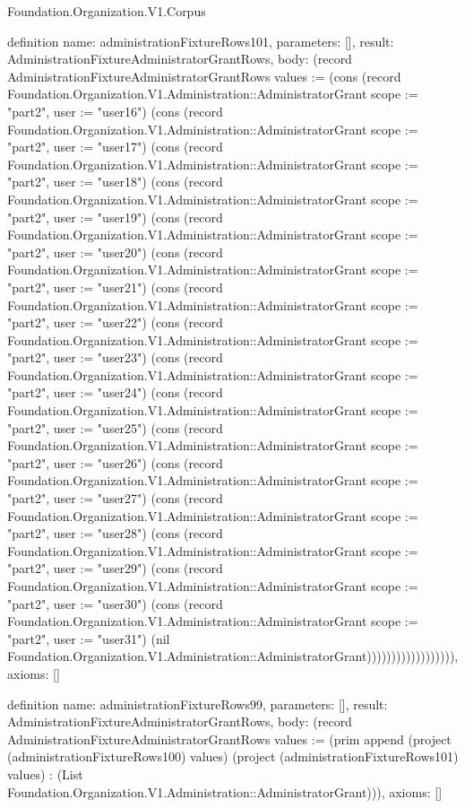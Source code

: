 \begin{lexlean}{Foundation.Organization.V1.Corpus}
\begin{semanticmodule}
definition{
  name: administrationFixtureRows101,
  parameters: [],
  result: AdministrationFixtureAdministratorGrantRows,
  body: (record AdministrationFixtureAdministratorGrantRows {values := (cons (record Foundation.Organization.V1.Administration::AdministratorGrant {scope := "part2", user := "user16"}) (cons (record Foundation.Organization.V1.Administration::AdministratorGrant {scope := "part2", user := "user17"}) (cons (record Foundation.Organization.V1.Administration::AdministratorGrant {scope := "part2", user := "user18"}) (cons (record Foundation.Organization.V1.Administration::AdministratorGrant {scope := "part2", user := "user19"}) (cons (record Foundation.Organization.V1.Administration::AdministratorGrant {scope := "part2", user := "user20"}) (cons (record Foundation.Organization.V1.Administration::AdministratorGrant {scope := "part2", user := "user21"}) (cons (record Foundation.Organization.V1.Administration::AdministratorGrant {scope := "part2", user := "user22"}) (cons (record Foundation.Organization.V1.Administration::AdministratorGrant {scope := "part2", user := "user23"}) (cons (record Foundation.Organization.V1.Administration::AdministratorGrant {scope := "part2", user := "user24"}) (cons (record Foundation.Organization.V1.Administration::AdministratorGrant {scope := "part2", user := "user25"}) (cons (record Foundation.Organization.V1.Administration::AdministratorGrant {scope := "part2", user := "user26"}) (cons (record Foundation.Organization.V1.Administration::AdministratorGrant {scope := "part2", user := "user27"}) (cons (record Foundation.Organization.V1.Administration::AdministratorGrant {scope := "part2", user := "user28"}) (cons (record Foundation.Organization.V1.Administration::AdministratorGrant {scope := "part2", user := "user29"}) (cons (record Foundation.Organization.V1.Administration::AdministratorGrant {scope := "part2", user := "user30"}) (cons (record Foundation.Organization.V1.Administration::AdministratorGrant {scope := "part2", user := "user31"}) (nil Foundation.Organization.V1.Administration::AdministratorGrant)))))))))))))))))}),
  axioms: []
}

definition{
  name: administrationFixtureRows99,
  parameters: [],
  result: AdministrationFixtureAdministratorGrantRows,
  body: (record AdministrationFixtureAdministratorGrantRows {values := (prim append (project (administrationFixtureRows100) values) (project (administrationFixtureRows101) values) : (List Foundation.Organization.V1.Administration::AdministratorGrant))}),
  axioms: []
}


\end{semanticmodule}
\end{lexlean}
